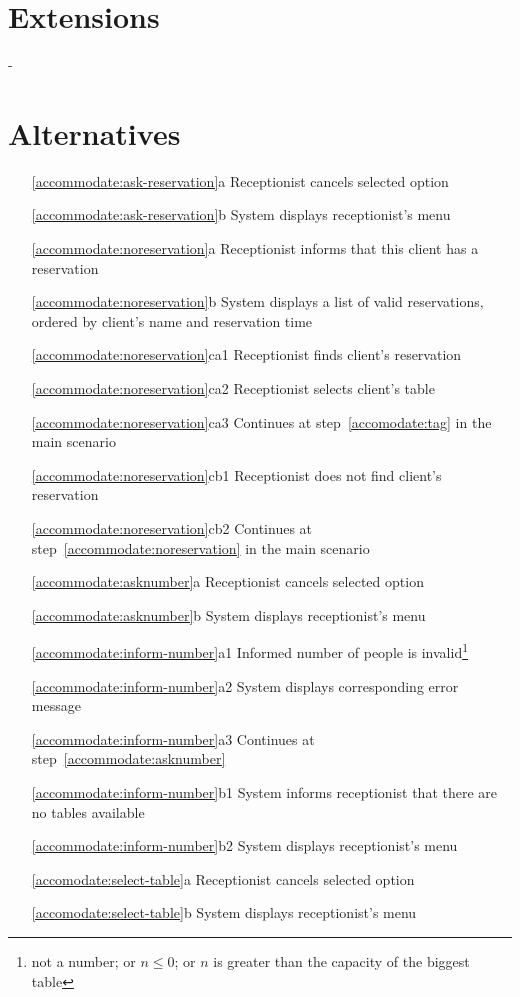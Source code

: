 \documentclass[a4paper,11pt,oneside]{book}
\newcommand{\cancel}[1]{#1 cancels selected option}
\newcommand{\menu}[1]{System displays #1's menu}
\begin{document}
\section{Extensions}

-

\section{Alternatives}

\begin{enumerate}
\item [\ref{accommodate:ask-reservation}a] \cancel{Receptionist}
\item [\ref{accommodate:ask-reservation}b] \menu{receptionist}
\\
\item [\ref{accommodate:noreservation}a] Receptionist informs that this client has a reservation
\item [\ref{accommodate:noreservation}b] System displays a list of valid reservations, ordered by client's name and reservation time
\\
\item [\ref{accommodate:noreservation}ca1] Receptionist finds client's reservation
\item [\ref{accommodate:noreservation}ca2] Receptionist selects client's table
\item [\ref{accommodate:noreservation}ca3] Continues at step~\ref{accomodate:tag} in the main scenario
\\
\item [\ref{accommodate:noreservation}cb1] Receptionist does not find client's reservation
\item [\ref{accommodate:noreservation}cb2] Continues at step~\ref{accommodate:noreservation} in the main scenario
\\
\item [\ref{accommodate:asknumber}a] \cancel{Receptionist}
\item [\ref{accommodate:asknumber}b] \menu{receptionist}
\\
\item [\ref{accommodate:inform-number}a1] Informed number of people is invalid\footnote{not a number; or $n \leq 0$; or $n$ is greater than the capacity of the biggest table}
\item [\ref{accommodate:inform-number}a2] System displays corresponding error message
\item [\ref{accommodate:inform-number}a3] Continues at step~\ref{accommodate:asknumber}
\\
\item [\ref{accommodate:inform-number}b1] System informs receptionist that there are no tables available
\item [\ref{accommodate:inform-number}b2] \menu{receptionist}
\\
\item [\ref{accomodate:select-table}a] \cancel{Receptionist}
\item [\ref{accomodate:select-table}b] \menu{receptionist}
\\
\end{enumerate}
\end{document}
